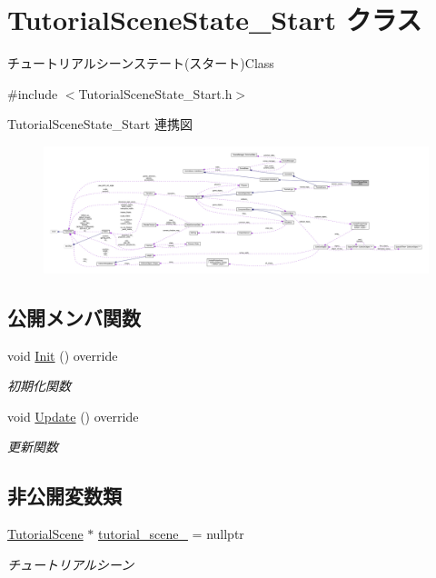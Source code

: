 \hypertarget{class_tutorial_scene_state___start}{}\section{Tutorial\+Scene\+State\+\_\+\+Start クラス}
\label{class_tutorial_scene_state___start}


チュートリアルシーンステート(スタート)Class  




{\ttfamily \#include $<$Tutorial\+Scene\+State\+\_\+\+Start.\+h$>$}



Tutorial\+Scene\+State\+\_\+\+Start 連携図\nopagebreak
\begin{figure}[H]
\begin{center}
\leavevmode
\includegraphics[width=350pt]{class_tutorial_scene_state___start__coll__graph}
\end{center}
\end{figure}
\subsection*{公開メンバ関数}
\begin{DoxyCompactItemize}
\item 
void \mbox{\hyperlink{class_tutorial_scene_state___start_acd4cd7e4efeebffa9616d7ca31c7b1c0}{Init}} () override
\begin{DoxyCompactList}\small\item\em 初期化関数 \end{DoxyCompactList}\item 
void \mbox{\hyperlink{class_tutorial_scene_state___start_a93c322692bf56172f383d3e5b17cd85c}{Update}} () override
\begin{DoxyCompactList}\small\item\em 更新関数 \end{DoxyCompactList}\end{DoxyCompactItemize}
\subsection*{非公開変数類}
\begin{DoxyCompactItemize}
\item 
\mbox{\hyperlink{class_tutorial_scene}{Tutorial\+Scene}} $\ast$ \mbox{\hyperlink{class_tutorial_scene_state___start_a1fea5f4f4713a1461a86cbc9fc263e41}{tutorial\+\_\+scene\+\_\+}} = nullptr
\begin{DoxyCompactList}\small\item\em チュートリアルシーン \end{DoxyCompactList}\end{DoxyCompactItemize}


